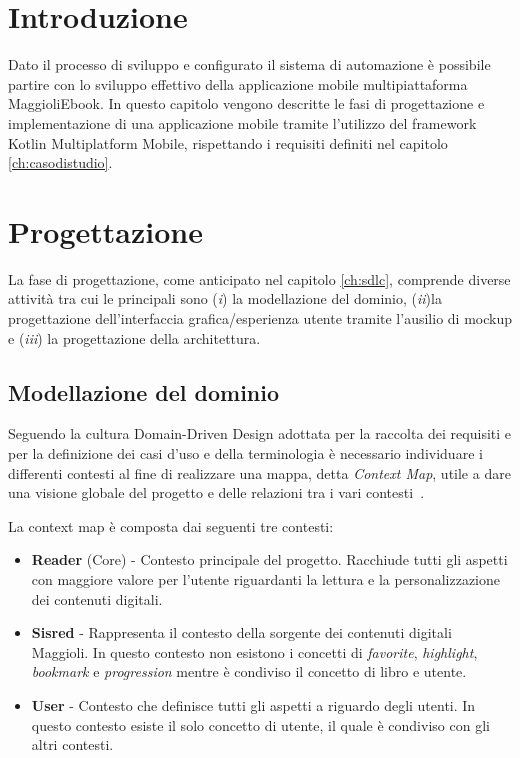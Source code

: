

\section{Introduzione}
Dato il processo di sviluppo e configurato il sistema di automazione è possibile partire con lo sviluppo effettivo della applicazione mobile multipiattaforma MaggioliEbook. In questo capitolo vengono descritte le fasi di progettazione e implementazione di una applicazione mobile tramite l'utilizzo del framework Kotlin Multiplatform Mobile, rispettando i requisiti definiti nel capitolo \ref{ch:casodistudio}.

\section{Progettazione}
La fase di progettazione, come anticipato nel capitolo \ref{ch:sdlc}, comprende diverse attività tra cui le principali sono (\textit{i}) la modellazione del dominio, (\textit{ii})la progettazione dell'interfaccia grafica/esperienza utente tramite l'ausilio di mockup e (\textit{iii}) la progettazione della architettura.

\subsection{Modellazione del dominio}
Seguendo la cultura Domain-Driven Design adottata per la raccolta dei requisiti e per la definizione dei casi d'uso e della terminologia è necessario individuare i differenti contesti al fine di realizzare una mappa, detta \textit{Context Map}, utile a dare una visione globale del progetto e delle relazioni tra i vari contesti~\cite{evans_domain-driven_2004}.

La context map è composta dai seguenti tre contesti:

\begin{itemize}
    \item \textbf{Reader} (Core) - Contesto principale del progetto. Racchiude tutti gli aspetti con maggiore valore per l'utente riguardanti la lettura e la personalizzazione dei contenuti digitali. 
    \item \textbf{Sisred} - Rappresenta il contesto della sorgente dei contenuti digitali Maggioli. In questo contesto non esistono i concetti di \textit{favorite}, \textit{highlight}, \textit{bookmark} e \textit{progression} mentre è condiviso il concetto di libro e utente.
    \item \textbf{User} - Contesto che definisce tutti gli aspetti a riguardo degli utenti. In questo contesto esiste il solo concetto di utente, il quale è condiviso con gli altri contesti.
\end{itemize}

